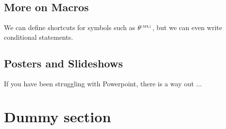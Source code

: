 \documentclass[a4paper,10pt]{report} %
\begin{document}
\subsection{More on Macros} 
 We can define shortcuts for symbols such as \(\theta^{\scriptscriptstyle \mathrm{(ML)}}\), but we can even write conditional statements.
 
 \subsection{Posters and Slideshows} 
 If you have been struggling with Powerpoint, there is a way out \( \ldots \) 
 
 \section{Dummy section}
 \lipsum[2-7]    %
 
 
 
\label{LastPage}
\newpage
\end{document}
